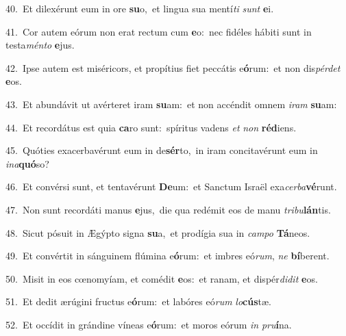 {\numbfont\textcolor{\numbcolor}{40.}}~Et dilexérunt eum in ore \textbf{su}\-o,~\star et lingua sua mentí\textit{ti} \textit{sunt} \textbf{e}\-i.\par
{\numbfont\textcolor{\numbcolor}{41.}}~Cor autem eórum non erat rectum cum \textbf{e}\-o:~\star nec fidéles hábiti sunt in testa\-\textit{mén}\-\textit{to} \textbf{e}\-jus.\par
{\numbfont\textcolor{\numbcolor}{42.}}~Ipse autem est miséricors, et propítius fiet peccátis e\-\textbf{ó}\-rum:~\star et non dis\-\textit{pér}\-\textit{det} \textbf{e}\-os.\par
{\numbfont\textcolor{\numbcolor}{43.}}~Et abundávit ut avérteret iram \textbf{su}\-am:~\star et non accéndit omnem \textit{i}\-\textit{ram} \textbf{su}\-am:\par
{\numbfont\textcolor{\numbcolor}{44.}}~Et recordátus est quia \textbf{ca}\-ro sunt:~\star spíritus vadens \textit{et} \textit{non} \textbf{réd}\-iens.\par
{\numbfont\textcolor{\numbcolor}{45.}}~Quóties exacerbavérunt eum in de\-\textbf{sér}\-to,~\star in iram concitavérunt eum in \textit{in}\-\textit{a}\textbf{quó}so?\par
{\numbfont\textcolor{\numbcolor}{46.}}~Et convérsi sunt, et tentavérunt \textbf{De}\-um:~\star et Sanctum Israël exa\-\textit{cer}\-\textit{ba}\textbf{vé}runt.\par
{\numbfont\textcolor{\numbcolor}{47.}}~Non sunt recordáti manus \textbf{e}\-jus,~\star die qua redémit eos de manu \textit{tri}\-\textit{bu}\textbf{lán}tis.\par
{\numbfont\textcolor{\numbcolor}{48.}}~Sicut pósuit in Ægýpto signa \textbf{su}\-a,~\star et prodígia sua in \textit{cam}\-\textit{po} \textbf{Tá}\-neos.\par
{\numbfont\textcolor{\numbcolor}{49.}}~Et convértit in sánguinem flúmina e\-\textbf{ó}\-rum:~\star et imbres eó\-\textit{rum}\-, \textit{ne} \textbf{bí}\-berent.\par
{\numbfont\textcolor{\numbcolor}{50.}}~Misit in eos cœnomyíam, et comédit \textbf{e}\-os:~\star et ranam, et dispér\-\textit{di}\-\textit{dit} \textbf{e}\-os.\par
{\numbfont\textcolor{\numbcolor}{51.}}~Et dedit ærúgini fructus e\-\textbf{ó}\-rum:~\star et labóres eó\textit{rum} \textit{lo}\-\textbf{cús}tæ.\par
{\numbfont\textcolor{\numbcolor}{52.}}~Et occídit in grándine víneas e\-\textbf{ó}\-rum:~\star et moros eórum \textit{in} \textit{pru}\-\textbf{í}na.\par
